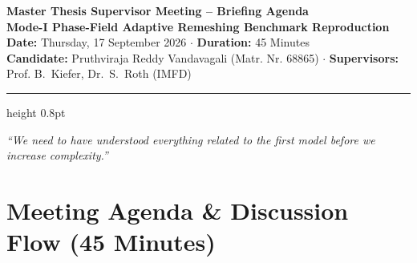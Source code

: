 \documentclass[10pt,a4paper]{article}
\begin{document}
\begin{center}
  {\Large\textbf{Master Thesis Supervisor Meeting -- Briefing Agenda}}\\[0.25em]
  {\large\textbf{Mode-I Phase-Field Adaptive Remeshing Benchmark Reproduction}}\\[0.2em]
  {\normalsize\textbf{Date:} Thursday, 17 September 2026 \quad $\cdot$ \quad \textbf{Duration:} 45 Minutes}\\[0.12em]
  {\footnotesize\textbf{Candidate:} Pruthviraja Reddy Vandavagali (Matr. Nr. 68865) \quad $\cdot$ \quad \textbf{Supervisors:} Prof. B.~Kiefer, Dr.~S.~Roth (IMFD)}
\end{center}
\vspace{-0.4em}
\hrule height 0.8pt
\vspace{0.4em}

\begin{tcolorbox}[colback=gray!5!white,colframe=gray!60!black,title=\textbf{Governing Supervisor Directive},top=2pt,bottom=2pt,left=4pt,right=4pt]
\centering
\small\emph{``We need to have understood everything related to the first model before we increase complexity.''}
\end{tcolorbox}

\vspace{0.2em}

\section*{Meeting Agenda \& Discussion Flow (45 Minutes)}
\vspace{-0.3em}
\end{document}
